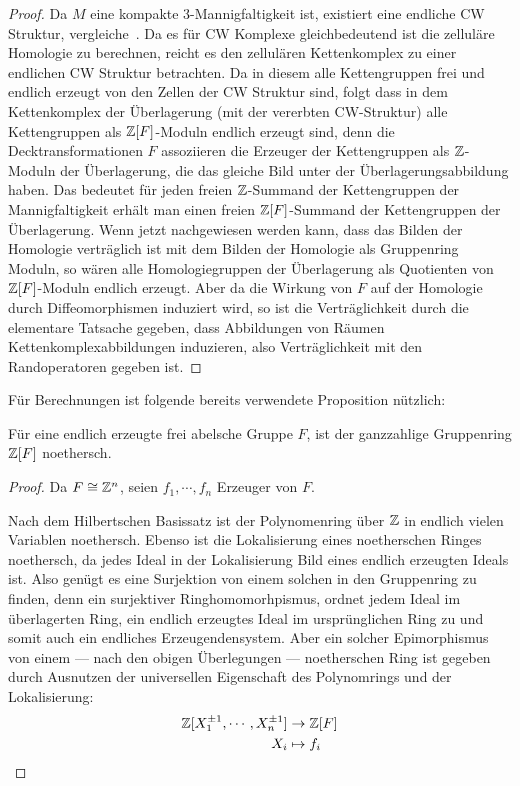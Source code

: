 	\begin{proof}
	Da $M$ eine kompakte 3-Mannigfaltigkeit ist, existiert eine endliche CW Struktur, vergleiche~\cite{Moise.1952}. Da es für CW Komplexe gleichbedeutend ist die zelluläre Homologie zu berechnen, reicht es den zellulären Kettenkomplex zu einer endlichen CW Struktur betrachten. Da in diesem alle Kettengruppen frei und endlich erzeugt von den Zellen der CW Struktur sind, folgt dass in dem Kettenkomplex der Überlagerung (mit der vererbten CW-Struktur) alle Kettengruppen als $\mathbb{Z}[F]$-Moduln endlich erzeugt sind, denn die Decktransformationen $F$ assoziieren die Erzeuger der Kettengruppen als $\mathbb{Z}$-Moduln der Überlagerung, die das gleiche Bild unter der Überlagerungsabbildung haben. Das bedeutet für jeden freien $\mathbb{Z}$-Summand der Kettengruppen der Mannigfaltigkeit erhält man einen freien $\mathbb{Z}[F]$-Summand der Kettengruppen der Überlagerung. Wenn jetzt nachgewiesen werden kann, dass das Bilden der Homologie verträglich ist mit dem Bilden der Homologie als Gruppenring Moduln, so wären alle Homologiegruppen der Überlagerung als Quotienten von $\mathbb{Z}[F]$-Moduln endlich erzeugt. Aber da die Wirkung von $F$ auf der Homologie durch Diffeomorphismen induziert wird, so ist die Verträglichkeit durch die elementare Tatsache gegeben, dass Abbildungen von Räumen Kettenkomplexabbildungen induzieren, also Verträglichkeit mit den Randoperatoren gegeben ist.
\end{proof}

Für Berechnungen ist folgende bereits verwendete Proposition nützlich:
\begin{prop}
	Für eine endlich erzeugte frei abelsche Gruppe $F$, ist der ganzzahlige Gruppenring $\mathbb{Z}[F]$ noethersch.
\end{prop}
\begin{proof}
	Da $F\cong \mathbb{Z}^n$, seien $f_1,\cdots,f_n$ Erzeuger von $F$.

	Nach dem Hilbertschen Basissatz ist der Polynomenring über $\mathbb{Z}$ in endlich vielen Variablen noethersch. Ebenso ist die Lokalisierung eines noetherschen Ringes noethersch, da jedes Ideal in der Lokalisierung Bild eines endlich erzeugten Ideals ist. Also genügt es eine Surjektion von einem solchen in den Gruppenring zu finden, denn ein surjektiver Ringhomomorhpismus, ordnet jedem Ideal im überlagerten Ring, ein endlich erzeugtes Ideal im ursprünglichen Ring zu und somit auch ein endliches Erzeugendensystem. Aber ein solcher Epimorphismus von einem --- nach den obigen Überlegungen --- noetherschen Ring ist gegeben durch Ausnutzen der universellen Eigenschaft des Polynomrings und der Lokalisierung:
	\begin{align*}
			\mathbb{Z}[X_1^{\pm 1},\cdots,X_{n}^{\pm 1}] & \to  \mathbb{Z}[F]\\
			X_i &\mapsto  f_i
	\end{align*}
\end{proof}

